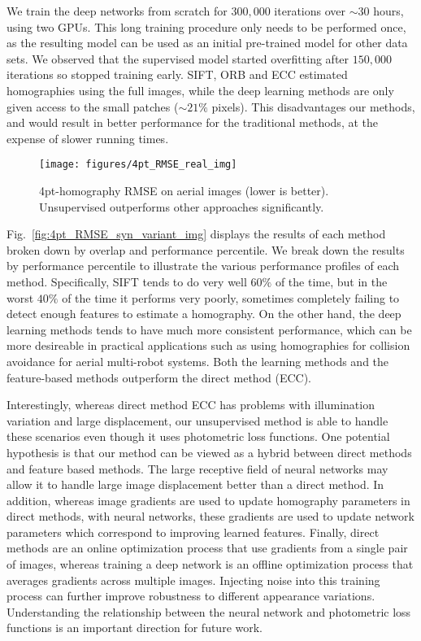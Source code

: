 \documentclass[letterpaper, 10 pt, conference]{ieeeconf}
\begin{document}
We train the deep networks from scratch for $300,000$ iterations over $\sim 30$ hours, using two GPUs. This long training procedure only needs to be performed once, as the resulting model can be used as an initial pre-trained model for other data sets. We observed that the supervised model started overfitting after $150,000$ iterations so stopped training early. SIFT, ORB and ECC estimated homographies using the full images, while the deep learning methods are only given access to the small patches ($\sim 21 \%$ pixels). This disadvantages our methods, and would result in better performance for the traditional methods, at the expense of slower running times.

\begin{figure}
\centering
\texttt{[image: figures/4pt\_RMSE\_real\_img]}
\caption{4pt-homography RMSE on aerial images (lower is better). Unsupervised outperforms other approaches significantly.}
\label{fig:4pt_RMSE_real_img}
\vspace{-4mm}
\end{figure}

Fig.~\ref{fig:4pt_RMSE_syn_variant_img} displays the results of each method broken down by overlap and performance percentile. We break down the results by performance percentile to illustrate the various performance profiles of each method. Specifically, SIFT tends to do very well $60 \%$ of the time, but in the worst $40 \%$ of the time it performs very poorly, sometimes completely failing to detect enough features to estimate a homography. On the other hand, the deep learning methods tends to have much more consistent performance, which can be more desireable in practical applications such as using homographies for collision avoidance for aerial multi-robot systems. Both the learning methods and the feature-based methods outperform the direct method (ECC). 

Interestingly, whereas direct method ECC has problems with illumination variation and large displacement, our unsupervised method is able to handle these scenarios even though it uses photometric loss functions. One potential hypothesis is that our method can be viewed as a hybrid between direct methods and feature based methods. The large receptive field of neural networks may allow it to handle large image displacement better than a direct method. In addition, whereas image gradients are used to update homography parameters in direct methods, with neural networks, these gradients are used to update network parameters which correspond to improving learned features. Finally, direct methods are an online optimization process that use gradients from a single pair of images, whereas training a deep network is an offline optimization process that averages gradients across multiple images. Injecting noise into this training process can further improve robustness to different appearance variations. Understanding the relationship between the neural network and photometric loss functions is an important direction for future work.
\end{document}
